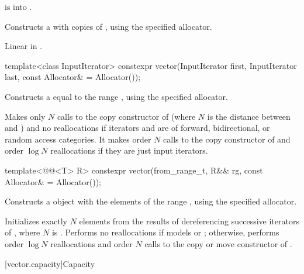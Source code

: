 \begin{itemdescr}
\pnum
\expects
{} is
 into .

\pnum
\effects
Constructs a  with 
copies of , using the specified allocator.

\pnum
\complexity
Linear in .
\end{itemdescr}

\begin{itemdecl}
template<class InputIterator>
  constexpr vector(InputIterator first, InputIterator last,
                   const Allocator& = Allocator());
\end{itemdecl}

\begin{itemdescr}
\pnum
\effects
Constructs a  equal to the
range , using the specified allocator.

\pnum
\complexity
Makes only $N$
calls to the copy constructor of
(where $N$
is the distance between
and
)
and no reallocations if iterators  and  are of forward, bidirectional, or random access categories.
It makes order
$N$
calls to the copy constructor of
and order
$\log N$
reallocations if they are just input iterators.
\end{itemdescr}

%
\begin{itemdecl}
template<@@<T> R>
  constexpr vector(from_range_t, R&& rg, const Allocator& = Allocator());
\end{itemdecl}

\begin{itemdescr}
\pnum
\effects
Constructs a  object with the elements of the range ,
using the specified allocator.

\pnum
\complexity
Initializes exactly $N$ elements
from the results of dereferencing successive iterators of ,
where $N$ is .
Performs no reallocations if  models
 or ;
otherwise, performs order $\log N$ reallocations and
order $N$ calls to the copy or move constructor of .
\end{itemdescr}

[vector.capacity]{Capacity}

